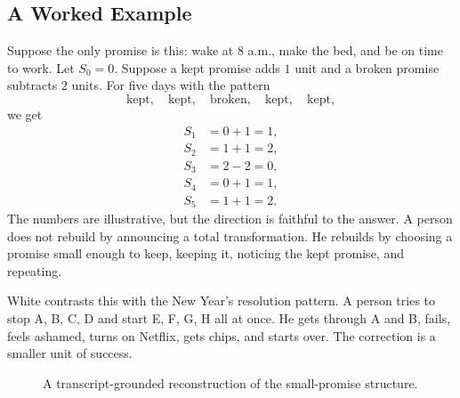 \subsection{A Worked Example}

Suppose the only promise is this: wake at 8 a.m., make the bed, and be on time to work. Let \(S_0=0\). Suppose a kept promise adds \(1\) unit and a broken promise subtracts \(2\) units. For five days with the pattern
\[
\text{kept},\quad
\text{kept},\quad
\text{broken},\quad
\text{kept},\quad
\text{kept},
\]
we get
\begin{align}
S_1 &= 0+1=1,\\
S_2 &= 1+1=2,\\
S_3 &= 2-2=0,\\
S_4 &= 0+1=1,\\
S_5 &= 1+1=2.
\end{align}
The numbers are illustrative, but the direction is faithful to the answer. A person does not rebuild by announcing a total transformation. He rebuilds by choosing a promise small enough to keep, keeping it, noticing the kept promise, and repeating.

White contrasts this with the New Year's resolution pattern. A person tries to stop A, B, C, D and start E, F, G, H all at once. He gets through A and B, fails, feels ashamed, turns on Netflix, gets chips, and starts over. The correction is a smaller unit of success.

\begin{figure}
\centering
{}
\caption{A transcript-grounded reconstruction of the small-promise structure.}
\end{figure}

